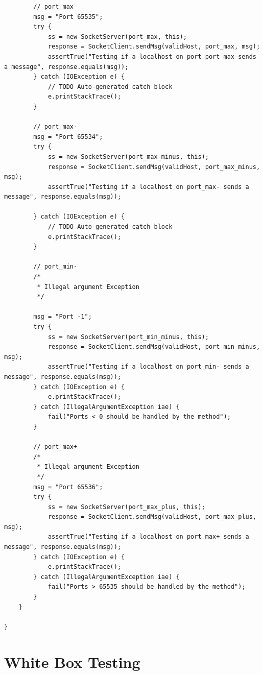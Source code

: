 \documentclass[fontsize=12pt,paper=letter,twoside]{scrartcl}
\begin{document}
\begin{itemize}
\begin{lstlisting}
		// port_max
		msg = "Port 65535";
		try {
			ss = new SocketServer(port_max, this);
			response = SocketClient.sendMsg(validHost, port_max, msg);
			assertTrue("Testing if a localhost on port port_max sends a message", response.equals(msg));
		} catch (IOException e) {
			// TODO Auto-generated catch block
			e.printStackTrace();
		}

		// port_max-
		msg = "Port 65534";
		try {
			ss = new SocketServer(port_max_minus, this);
			response = SocketClient.sendMsg(validHost, port_max_minus, msg);
			assertTrue("Testing if a localhost on port_max- sends a message", response.equals(msg));

		} catch (IOException e) {
			// TODO Auto-generated catch block
			e.printStackTrace();
		}

		// port_min-
		/*
		 * Illegal argument Exception
		 */

		msg = "Port -1";
		try {
			ss = new SocketServer(port_min_minus, this);
			response = SocketClient.sendMsg(validHost, port_min_minus, msg);
			assertTrue("Testing if a localhost on port_min- sends a message", response.equals(msg));
		} catch (IOException e) {
			e.printStackTrace();
		} catch (IllegalArgumentException iae) {
			fail("Ports < 0 should be handled by the method");
		}

		// port_max+
		/*
		 * Illegal argument Exception
		 */
		msg = "Port 65536";
		try {
			ss = new SocketServer(port_max_plus, this);
			response = SocketClient.sendMsg(validHost, port_max_plus, msg);
			assertTrue("Testing if a localhost on port_max+ sends a message", response.equals(msg));
		} catch (IOException e) {
			e.printStackTrace();
		} catch (IllegalArgumentException iae) {
			fail("Ports > 65535 should be handled by the method");
		}
	}

}
\end{lstlisting}
\end{itemize}
\newpage
\section{White Box Testing}
\end{document}
